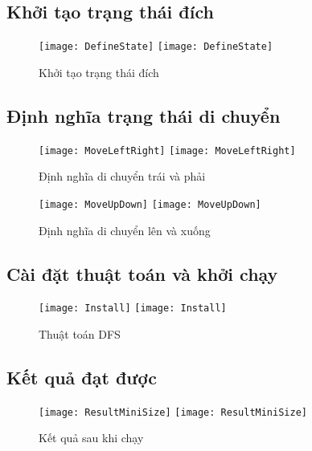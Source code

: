 \subsection{Khởi tạo trạng thái đích}
\begin{figure}[!htbp]
  \begin{center}
    \leavevmode
    \ifpdf
      \texttt{[image: DefineState]}
    \else
      \texttt{[image: DefineState]}
    \fi
    \caption{Khởi tạo trạng thái đích}
    \label{FigAir}
   
  \end{center}
\end{figure}
\FloatBarrier
\subsection{Định nghĩa trạng thái di chuyển}
\begin{figure}
  \begin{center}
 \leavevmode
    \ifpdf
      \texttt{[image: MoveLeftRight]}
    \else
      \texttt{[image: MoveLeftRight]}
    \fi
    \caption{Định nghĩa di chuyển trái và phải}
    \label{FigAir}
 \end{center}
\end{figure}
\FloatBarrier

\begin{figure}
  \begin{center}
    \leavevmode
    \ifpdf
      \texttt{[image: MoveUpDown]}
    \else
      \texttt{[image: MoveUpDown]}
    \fi
    \caption{Định nghĩa di chuyển lên và xuống}
    \label{FigAir}
  \end{center}
\end{figure}
\FloatBarrier
\subsection{Cài đặt thuật toán và khởi chạy}
\begin{figure}[!htbp]
\begin{center}
    \leavevmode
    \ifpdf
      \texttt{[image: Install]}
    \else
      \texttt{[image: Install]}
    \fi
    \caption{Thuật toán DFS}
    \label{FigAir}
  \end{center}
\end{figure}
\FloatBarrier
\subsection{Kết quả đạt được}
\begin{figure}[!htbp]
\begin{center}
    \leavevmode
    \ifpdf
      \texttt{[image: ResultMiniSize]}
    \else
      \texttt{[image: ResultMiniSize]}
    \fi
    \caption{Kết quả sau khi chạy}
    \label{FigAir}
  \end{center}
\end{figure}
\FloatBarrier


